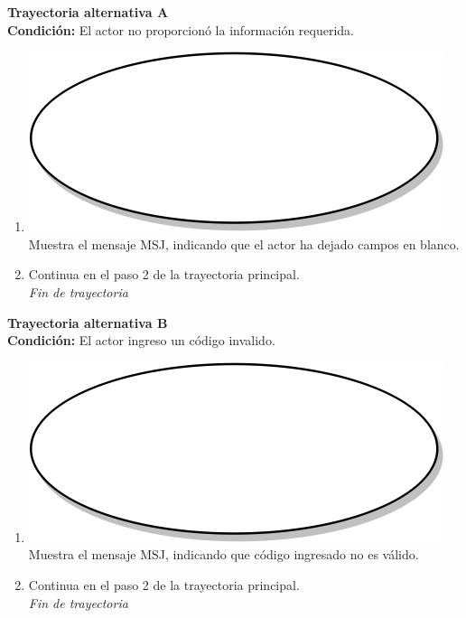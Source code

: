 \textbf{Trayectoria alternativa A} \label{cu2_1_ta_a} \\
\textbf{Condición:} El actor no proporcionó la información requerida.\\
 \begin{enumerate}[label=A\arabic*]
    \item {\includegraphics[scale=.05]{Capitulo3/img/proceso.png} Muestra el mensaje MSJ, indicando que el actor ha dejado campos en blanco.}
    \item {Continua en el paso 2 de la trayectoria principal.} \\
    \textit{Fin de trayectoria} \\
\end{enumerate}

\textbf{Trayectoria alternativa B} \label{cu2_1_ta_b} \\
\textbf{Condición:} El actor ingreso un código invalido. \\
 \begin{enumerate}[label=\arabic*]
    \item {\includegraphics[scale=.05]{Capitulo3/img/proceso.png} Muestra el mensaje MSJ, indicando que código ingresado no es válido. }
    \item {Continua en el paso 2 de la trayectoria principal.} \\
    \textit{Fin de trayectoria} \\
\end{enumerate}

